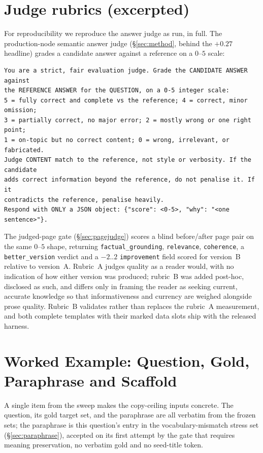 \documentclass[10pt,twocolumn]{article}
\begin{document}
\appendix
\onecolumn
\section{Judge rubrics (excerpted)}\label{sec:appendix-rubrics}
For reproducibility we reproduce the answer judge as run, in full. The
production-node semantic answer judge (\S\ref{sec:method}, behind the $+0.27$
headline) grades a candidate answer against a reference on a $0$--$5$ scale:

{\footnotesize\begin{verbatim}
You are a strict, fair evaluation judge. Grade the CANDIDATE ANSWER against
the REFERENCE ANSWER for the QUESTION, on a 0-5 integer scale:
5 = fully correct and complete vs the reference; 4 = correct, minor omission;
3 = partially correct, no major error; 2 = mostly wrong or one right point;
1 = on-topic but no correct content; 0 = wrong, irrelevant, or fabricated.
Judge CONTENT match to the reference, not style or verbosity. If the candidate
adds correct information beyond the reference, do not penalise it. If it
contradicts the reference, penalise heavily.
Respond with ONLY a JSON object: {"score": <0-5>, "why": "<one sentence>"}.
\end{verbatim}}

\noindent The judged-page gate (\S\ref{sec:pagejudge}) scores a blind before/after page pair on the
same $0$--$5$ shape, returning \texttt{factual\_grounding}, \texttt{relevance}, \texttt{coherence}, a
\texttt{better\_version} verdict and a $-2..2$ \texttt{improvement} field scored for version~B relative
to version~A. Rubric~A judges quality as a reader would, with no indication of how either version was
produced; rubric~B was added post-hoc, disclosed as such, and differs only in framing the reader as
seeking current, accurate knowledge so that informativeness and currency are weighed alongside prose
quality. Rubric~B validates rather than replaces the rubric~A measurement, and both complete templates
with their marked data slots ship with the released harness.

\section{Worked Example: Question, Gold, Paraphrase and Scaffold}\label{sec:appendix-samples}
A single item from the sweep makes the copy-ceiling inputs concrete. The question, its gold
target set, and the paraphrase are all verbatim from the frozen sets; the paraphrase is this
question's entry in the vocabulary-mismatch stress set (\S\ref{sec:paraphrase}), accepted on its
first attempt by the gate that requires meaning preservation, no verbatim gold and no seed-title
token.
\end{document}
